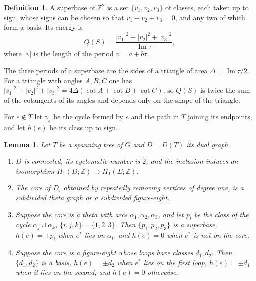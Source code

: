\documentclass[11pt]{amsart}
\newtheorem{lemma}[theorem]{Lemma}
\theoremstyle{definition}
\newtheorem{definition}[theorem]{Definition}
\theoremstyle{remark}
\newcommand{\Z}{\mathbb{Z}}
\begin{document}
\begin{definition}\label{def:superbase}
A superbase of $\Z^2$ is a set $\{v_1,v_2,v_3\}$ of classes, each taken up to sign, whose signs can be chosen so that
$v_1+v_2+v_3=0$, and any two of which form a basis. Its energy is
\begin{equation}\label{eq:Q}
  Q(S)=\frac{|v_1|^2+|v_2|^2+|v_3|^2}{\operatorname{Im}\tau},
\end{equation}
where $|v|$ is the length of the period $v=a+b\tau$.
\end{definition}

The three periods of a superbase are the sides of a triangle of area $\Delta=\operatorname{Im}\tau/2$. For a triangle
with angles $A,B,C$ one has $|v_1|^2+|v_2|^2+|v_3|^2=4\Delta(\cot A+\cot B+\cot C)$, so $Q(S)$ is twice the sum of the
cotangents of its angles and depends only on the shape of the triangle.

For $e\notin T$ let $\gamma_e$ be the cycle formed by $e$ and the path in $T$ joining its endpoints, and let $h(e)$ be
its class up to sign.

\begin{lemma}\label{lem:struct}
Let $T$ be a spanning tree of $G$ and $D=D(T)$ its dual graph.
\begin{enumerate}
\item $D$ is connected, its cyclomatic number is $2$, and the inclusion induces an isomorphism $H_1(D;\Z)\to
H_1(\Sigma;\Z)$.
\item The core of $D$, obtained by repeatedly removing vertices of degree one, is a subdivided theta graph or a
subdivided figure-eight.
\item Suppose the core is a theta with arcs $\alpha_1,\alpha_2,\alpha_3$, and let $p_i$ be the class of the cycle
$\alpha_j\cup\alpha_k$, $\{i,j,k\}=\{1,2,3\}$. Then $\{p_1,p_2,p_3\}$ is a superbase, $h(e)=\pm p_i$ when $e^*$ lies
on $\alpha_i$, and $h(e)=0$ when $e^*$ is not on the core.
\item Suppose the core is a figure-eight whose loops have classes $d_1,d_2$. Then $\{d_1,d_2\}$ is a basis,
$h(e)=\pm d_2$ when $e^*$ lies on the first loop, $h(e)=\pm d_1$ when it lies on the second, and $h(e)=0$ otherwise.
\end{enumerate}
\end{lemma}
\end{document}
